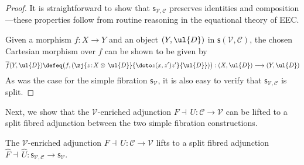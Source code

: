 \begin{proof}
It is straightforward to show that $\mathsf{s}_{\mathcal{V},\mathcal{C}}$ preserves identities and composition---these properties follow from routine reasoning in the equational theory of EEC\raisebox{0.75pt}{+}.

Given a morphism $f : X \longrightarrow Y$ and an object $(Y,\ul{D})$ in $\mathsf{s}(\!\mathcal{V},\mathcal{C})$, the chosen Cartesian morphism over $f$ can be shown to be given by
\[
\overline{f}(Y,\ul{D}) \defeq \big(f, (\zj {z \!:\! X \otimes\, \ul{D}} {\doto z {(x,z')} {} {z'}} {\ul{D}})\big) : (X,\ul{D}) \longrightarrow (Y,\ul{D})
\]
As was the case for the simple fibration $\mathsf{s}_{\mathcal{V}}$, it is also easy to verify that $\mathsf{s}_{\mathcal{V},\mathcal{C}}$ is split.
\end{proof}

Next, we show that the $\mathcal{V}$-enriched adjunction $F \dashv\, U : \mathcal{C} \longrightarrow \mathcal{V}$ can be lifted to a split fibred adjunction between the two simple fibration constructions. 


\begin{proposition}
The $\mathcal{V}$-enriched adjunction $F \dashv\, U : \mathcal{C} \longrightarrow \mathcal{V}$ lifts to a split fibred adjunction $\widehat{F} \dashv\, \widehat{U} : \mathsf{s}_{\mathcal{V},\mathcal{C}} \longrightarrow \mathsf{s}_{\mathcal{V}}$.
\end{proposition}

